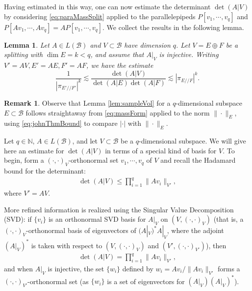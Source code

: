 \documentclass[11pt]{amsart}
\theoremstyle{theorem}
\newtheorem{lem}[thm]{Lemma}
\theoremstyle{definition}
\newtheorem{rmk}[thm]{Remark}
\numberwithin{equation}{section}
\newcommand{\N}{\mathbb{N}}
\newcommand{\Bc}{\mathcal{B}}
\newcommand{\ds}{/ \! /}
\begin{document}
Having estimated in this way, one can now estimate the determinant $\det(A | V)$ by considering \eqref{eq:paraMassSplit} applied to the parallelepipeds $P[v_1, \cdots, v_q]$ and $P[A v_1, \cdots, A v_q] = A P[v_1, \cdots, v_q]$. We collect the results in the following lemma. 

\begin{lem} \label{lem:detSplit}
Let $A \in L(\Bc)$ and $V \subset \Bc$ have dimension $q$. Let $V = E \oplus F$ be a splitting with $\dim E = k < q$, and assume that $A|_V$ is injective. Writing $V' = A V, E' = A E, F' = A F$, we have the estimate
\[
\frac{1}{|\pi_{E' \ds F'}|^k} \lesssim \frac{\det(A | V)}{\det(A | E) \det(A | F)} \lesssim |\pi_{E \ds F}|^k.
\]
\end{lem}

\begin{rmk} \label{rmk:sampleVolProof}
Observe that Lemma \ref{lem:sampleVol} for a $q$-dimensional subspace $E \subset \Bc$ follows straightaway from \eqref{eq:massForm} applied to the norm $\|\cdot\|_E$, using \eqref{eq:johnThmBound} to compare $|\cdot|$ with $\|\cdot\|_E$.
\end{rmk}

\smallskip
{}

Let $q \in \N$, $A \in L(\Bc)$, and let $V \subset \Bc$ be a $q$-dimensional subspace. We will give here an estimate for $\det(A | V)$ in terms of a special kind of basis for $V$.  To begin, form a $(\cdot, \cdot)_V$-orthonormal set $v_1, \cdots, v_q$ of $V$ and recall the Hadamard bound for the determinant:
\begin{align}\label{eq:hadamardBoundIP}
\det(A | V) \leq \prod_{i = 1}^q \|A v_i \|_{V'},
\end{align}
where $V' = A V$. 

More refined information is realized using the Singular Value Decomposition (SVD): if $\{v_i\}$ is an orthonormal SVD basis for $A|_V$ on $(V, (\cdot, \cdot)_V)$ (that is, a $(\cdot, \cdot)_V$-orthonormal basis of eigenvectors of $(A|_V)^* A|_V$, where the adjoint $(A|_V)^*$ is taken with respect to $(V, (\cdot, \cdot)_V)$ and $(V', (\cdot, \cdot)_{V'})$), then 
\begin{align}\label{eq:SVDformula}
\det(A | V) = \prod_{i = 1}^q \|A v_i\|_{V'},
\end{align}
and when $A|_V$ is injective, the set $\{w_i\}$ defined by $w_i = A v_i / \|A v_i\|_{V'}$ forms a $(\cdot, \cdot)_{V'}$-orthonormal set (as $\{w_i\}$ is a set of eigenvectors for $(A|_V) (A|_V)^*$). 
\end{document}
